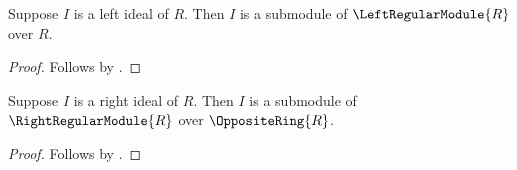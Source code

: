 \begin{proposition}\label{left_ideal_is_submodule}
    Suppose $I$ is a left ideal of $R$.
    Then $I$ is a submodule of $\LeftRegularModule{R}$ over $R$.
\end{proposition}
\begin{proof}
    Follows by .
\end{proof}

\begin{proposition}\label{right_ideal_is_submodule}
    Suppose $I$ is a right ideal of $R$.
    Then $I$ is a submodule of $\RightRegularModule{R}$ over
        $\OppositeRing{R}$.
\end{proposition}
\begin{proof}
    Follows by .
\end{proof}

